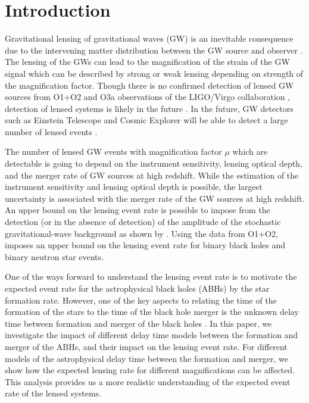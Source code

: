 \documentclass[a4paper,useAMS,usenatbib]{mnras}
\begin{document}
\section{Introduction}
Gravitational lensing of gravitational waves (GW) is an inevitable consequence due to the intervening matter distribution between the GW source and observer \citep{1992grle.book.....S, Bartelmann:2010fz, PhysRevLett.80.1138, Wang:1996as,Takahashi:2003ix, Dai:2016igl, Broadhurst:2018saj, Diego:2018fzr, Mukherjee:2019wcg, Oguri:2019fix,Mukherjee:2019wfw,Mukherjee:2020tvr}. The lensing of the GWs can lead to the magnification of the strain of the GW signal which can be described by strong or weak lensing depending on strength of the magnification factor. Though there is no confirmed detection of lensed GW sources from O1+O2 \citep{2019ApJ...874L...2H} and O3a observations of the LIGO/Virgo collaboration \citep{Abbott:2021iab}, detection of lensed systems is likely in the future \citep{Dai:2016igl, Ng:2017yiu, Broadhurst:2018saj, Broadhurst:2019ijv, Diego:2019rzc, Mukherjee:2020tvr, Broadhurst:2020moy}. In the future, GW detectors such as Einstein Telescope and Cosmic Explorer will be able to detect a large number of lensed events \citep{2013JCAP...10..022P, 2014JCAP...10..080B, 2015JCAP...12..006D}.

The number of lensed GW events with magnification factor $\mu$ which are detectable is going to depend on the instrument sensitivity, lensing optical depth, and the merger rate of GW sources at high redshift. While the estimation of the instrument sensitivity and lensing optical depth is possible, the largest uncertainty is associated with the merger rate of the GW sources at high redshift. An upper bound on the lensing event rate is possible to impose from the detection (or in the absence of detection) of the amplitude of the stochastic gravitational-wave background as shown by \citet{Mukherjee:2020tvr}. Using the data from O1+O2, \citet{Buscicchio:2020cij, Buscicchio:2020bdq} imposes an upper bound on the lensing event rate for binary black holes and binary neutron star events. 

One of the ways forward to understand the lensing event rate is to motivate the expected event rate for the astrophysical black holes (ABHs) by the star formation rate. However, one of the key aspects to relating the time of the formation of the stars to the time of the black hole merger is the unknown delay time between formation and merger of the black holes \citep{2010ApJ...716..615O,2010MNRAS.402..371B, 2012ApJ...759...52D, Dominik:2014yma, 2016MNRAS.458.2634M, Lamberts:2016txh, 2018MNRAS.474.4997C, Elbert:2017sbr, Eldridge:2018nop, Vitale:2018yhm, Buisson:2020hoq,Santoliquido:2020axb}. In this paper, we investigate the impact of different delay time models between the formation and merger of the ABHs, and their impact on the lensing event rate. For different models of the astrophysical delay time between the formation and merger, we show how the expected lensing rate for different magnifications can be affected. This analysis provides us a more realistic understanding of the expected event rate of the lensed systems.
\end{document}
